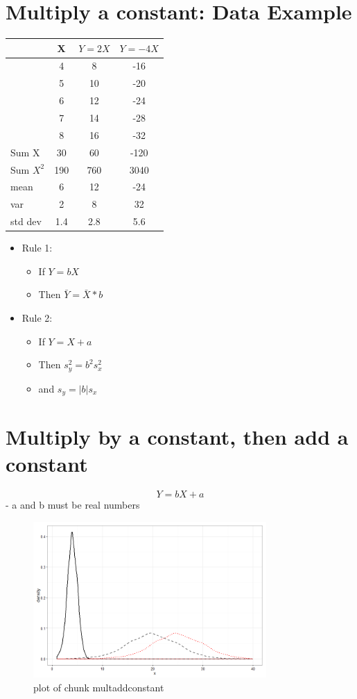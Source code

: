 \documentclass[12pt]{article}
\begin{document}
\section{Multiply a constant: Data
Example}\label{multiply-a-constant-data-example}

\begin{longtable}[c]{@{}lccc@{}}
\toprule
& X & \(Y = 2X\) & \(Y = -4X\)\tabularnewline
\midrule
\endhead
& 4 & 8 & -16\tabularnewline
& 5 & 10 & -20\tabularnewline
& 6 & 12 & -24\tabularnewline
& 7 & 14 & -28\tabularnewline
& 8 & 16 & -32\tabularnewline
\midrule
Sum X & 30 & 60 & -120\tabularnewline
Sum \(X^2\) & 190 & 760 & 3040\tabularnewline
mean & 6 & 12 & -24\tabularnewline
var & 2 & 8 & 32\tabularnewline
std dev & 1.4 & 2.8 & 5.6\tabularnewline
\bottomrule
\end{longtable}

\begin{itemize}
\itemsep1pt\parskip0pt
\item
  Rule 1:

  \begin{itemize}
  \itemsep1pt\parskip0pt
  \item
    If \(Y = bX\)
  \item
    Then \(\bar{Y} = \bar{X} * b\)
  \end{itemize}
\item
  Rule 2:

  \begin{itemize}
  \itemsep1pt\parskip0pt
  \item
    If \(Y = X + a\)
  \item
    Then \(s_{y}^2 = b^2s_{x}^2\)
  \item
    and \(s_{y} = |b|s_{x}\)
  \end{itemize}
\end{itemize}

\section{Multiply by a constant, then add a
constant}\label{multiply-by-a-constant-then-add-a-constant}

\[Y = bX + a\] - a and b must be real numbers

\begin{figure}[H]
\centering
\includegraphics[width=3.5in]{figure/multaddconstant-1.png}
\caption{plot of chunk multaddconstant}
\end{figure}
\end{document}
